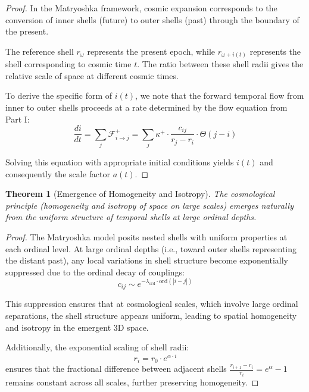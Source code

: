 \documentclass[12pt,a4paper]{article}
\newtheorem{theorem}{Theorem}[section]
\newcommand{\ord}{\text{ord}}
\newcommand{\F}{\mathcal{F}}
\begin{document}
\begin{proof}
In the Matryoshka framework, cosmic expansion corresponds to the conversion of inner shells (future) to outer shells (past) through the boundary of the present.

The reference shell $r_{\omega}$ represents the present epoch, while $r_{\omega+i(t)}$ represents the shell corresponding to cosmic time $t$. The ratio between these shell radii gives the relative scale of space at different cosmic times.

To derive the specific form of $i(t)$, we note that the forward temporal flow from inner to outer shells proceeds at a rate determined by the flow equation from Part I:
\begin{equation}
\frac{di}{dt} = \sum_j \F^+_{i \to j} = \sum_j \kappa^+ \cdot \frac{c_{ij}}{r_j - r_i} \cdot \Theta(j - i)
\end{equation}

Solving this equation with appropriate initial conditions yields $i(t)$ and consequently the scale factor $a(t)$.
\end{proof}

\begin{theorem}[Emergence of Homogeneity and Isotropy]
\label{thm:homogeneity-isotropy}
The cosmological principle (homogeneity and isotropy of space on large scales) emerges naturally from the uniform structure of temporal shells at large ordinal depths.
\end{theorem}

\begin{proof}
The Matryoshka model posits nested shells with uniform properties at each ordinal level. At large ordinal depths (i.e., toward outer shells representing the distant past), any local variations in shell structure become exponentially suppressed due to the ordinal decay of couplings:
\begin{equation}
c_{ij} \sim e^{-\lambda_{\ord} \cdot \ord(|i-j|)}
\end{equation}

This suppression ensures that at cosmological scales, which involve large ordinal separations, the shell structure appears uniform, leading to spatial homogeneity and isotropy in the emergent 3D space.

Additionally, the exponential scaling of shell radii:
\begin{equation}
r_i = r_0 \cdot e^{\alpha \cdot i}
\end{equation}
ensures that the fractional difference between adjacent shells $\frac{r_{i+1}-r_i}{r_i} = e^{\alpha} - 1$ remains constant across all scales, further preserving homogeneity.
\end{proof}
\end{document}
